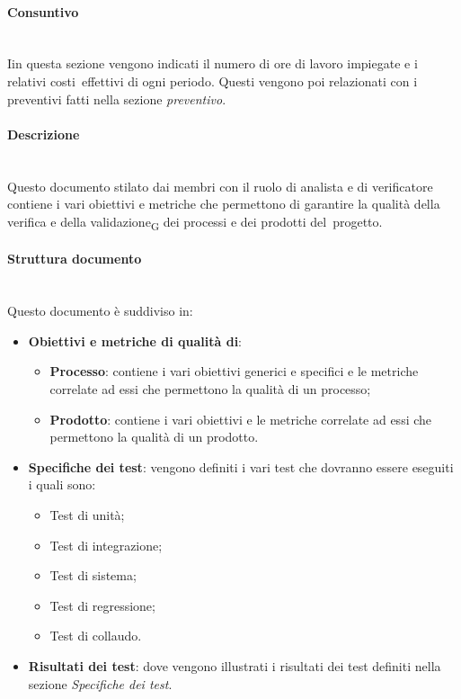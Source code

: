 \paragraph {Consuntivo}\mbox{}\\
Iin questa sezione vengono indicati il numero di ore di lavoro impiegate e i relativi costi effettivi di ogni periodo. Questi vengono poi relazionati con i preventivi fatti nella sezione \textit{preventivo}.

\paragraph {Descrizione}\mbox{}\\
Questo documento stilato dai membri con il ruolo di analista e di verificatore contiene i vari obiettivi e metriche che permettono di garantire la qualità della verifica e della validazione\textsubscript{G} dei processi e dei prodotti del progetto.
\paragraph {Struttura documento}\mbox{}\\
Questo documento è suddiviso in:
\begin{itemize}
	\item \textbf{Obiettivi e metriche di qualità di}:
	\begin{itemize}
		\item \textbf{Processo}: contiene i vari obiettivi generici e specifici e le metriche correlate ad essi che permettono la qualità di un processo;
		\item \textbf{Prodotto}: contiene i vari obiettivi e le metriche correlate ad essi che permettono la qualità di un prodotto.
	\end{itemize}
	\item \textbf{Specifiche dei test}: vengono definiti i vari test che dovranno essere eseguiti i quali sono:
	\begin{itemize}
		\item Test di unità;
		\item Test di integrazione;
		\item Test di sistema;
		\item Test di regressione;
		\item Test di collaudo.
	\end{itemize}
	\item \textbf{Risultati dei test}: dove vengono illustrati i risultati dei test definiti nella sezione \textit{Specifiche dei test}.
\end{itemize} 
